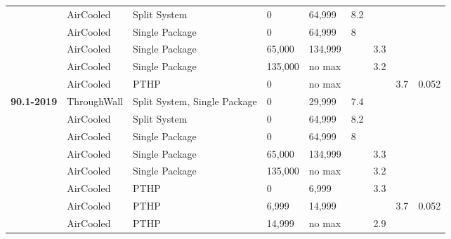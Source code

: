 \begin{table}[h!]
\begin{tabular}{|p{0.4in}|p{0.5in}|p{0.75in}|p{0.4in}|p{0.4in}|p{0.4in}|p{0.4in}|p{0.4in}|p{0.4in}|}
                                    & AirCooled   & Split   System                 & 0       & 64,999    & 8.2 &     &     &       \\ \cline{2-9} 
                                    & AirCooled   & Single   Package               & 0       & 64,999    & 8   &     &     &       \\ \cline{2-9} 
                                    & AirCooled   & Single   Package               & 65,000  & 134,999   &     & 3.3 &     &       \\ \cline{2-9} 
                                    & AirCooled   & Single   Package               & 135,000 & no max    &     & 3.2 &     &       \\ \cline{2-9} 
                                    & AirCooled   & PTHP                           & 0       & no max    &     &     & 3.7 & 0.052 \\ \hline
\multirow{8}{*}{\textbf{90.1-2019}} & ThroughWall & Split   System, Single Package & 0       & 29,999    & 7.4 &     &     &       \\ \cline{2-9} 
                                    & AirCooled   & Split   System                 & 0       & 64,999    & 8.2 &     &     &       \\ \cline{2-9} 
                                    & AirCooled   & Single   Package               & 0       & 64,999    & 8   &     &     &       \\ \cline{2-9} 
                                    & AirCooled   & Single   Package               & 65,000  & 134,999   &     & 3.3 &     &       \\ \cline{2-9} 
                                    & AirCooled   & Single   Package               & 135,000 & no max    &     & 3.2 &     &       \\ \cline{2-9} 
                                    & AirCooled   & PTHP                           & 0       & 6,999     &     & 3.3 &     &       \\ \cline{2-9} 
                                    & AirCooled   & PTHP                           & 6,999   & 14,999    &     &     & 3.7 & 0.052 \\ \cline{2-9} 
                                    & AirCooled   & PTHP                           & 14,999  & no max    &     & 2.9 &     &       \\ \hline
\end{tabular}
\end{table}